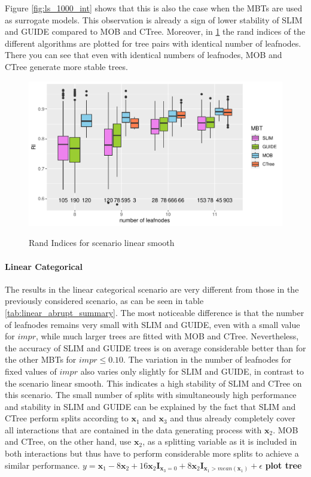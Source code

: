 Figure \ref{fig:ls_1000_int} shows that this is also the case when the MBTs are used as surrogate models. 
This observation is already a sign of lower stability of SLIM and GUIDE compared to MOB and CTree. Moreover, in \ref{fig:ls_1000_standalone_sta} the rand indices of the different algorithms are plotted for tree pairs with identical number of leafnodes. There you can see that even with identical numbers of leafnodes, MOB and CTree generate more stable trees.


\begin{figure}
\caption{Rand Indices for scenario linear smooth}
    \centering
    \includegraphics[width=16cm]{Figures/simulations/batchtools/basic_scenarios/linear_smooth/ls_1000_standalone_sta.pdf}
    \label{fig:ls_1000_standalone_sta}
\end{figure}

\paragraph{Linear Categorical} 
The results in the linear categorical scenario are very different from those in the previously considered scenario, as can be seen in table \ref{tab:linear_abrupt_summary}. The most noticeable difference is that the number of leafnodes remains very small with SLIM and GUIDE, even with a small value for $impr$, while much larger trees are fitted with MOB and CTree. Nevertheless, the accuracy of SLIM and GUIDE trees is on average considerable better than for the other MBTs for $impr \leq 0.10$.
The variation in the number of leafnodes for fixed values of $impr$ also varies only slightly for SLIM and GUIDE, in contrast to the scenario linear smooth. This indicates a high stability of SLIM and CTree on this scenario. 
The small number of splits with simultaneously high performance and stability in SLIM and GUIDE can be explained by the fact that SLIM and CTree perform splits according to $\textbf{x}_1$ and $\textbf{x}_3$ and thus already completely cover all interactions that are contained in the data generating process with $\textbf{x}_2$. MOB and CTree, on the other hand, use $\textbf{x}_2$, as a splitting variable as it is included in both interactions but thus have to perform considerable more splits to achieve a similar performance.
$ y =  \textbf{x}_{1} - 8  \textbf{x}_2 + 16  \textbf{x}_2  \mathbf{I}_{\textbf{x}_3 = 0} + 8  \textbf{x}_2  \mathbf{I}_{\textbf{x}_1 > mean(\textbf{x}_1)} + \epsilon $
\textbf{plot tree}


